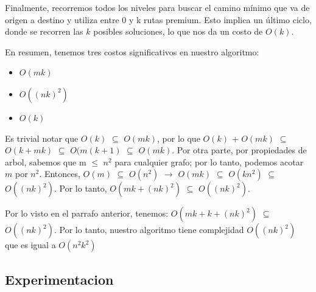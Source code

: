 Finalmente, recorremos todos los niveles para buscar el camino mínimo que va de origen a destino y utiliza entre 0 y k rutas premium. Esto implica un último ciclo, donde se recorren las $k$ posibles soluciones, lo que nos da un costo de $O(k)$.
\\
\par
En resumen, tenemos tres costos significativos en nuestro algoritmo:
\begin{itemize}
\item $O(mk)$
\item $O((nk)^2)$
\item $O(k)$
\end{itemize}
Es trivial notar que $O(k)$ $\subseteq$ $O(mk)$, por lo que $O(k)$ + $O(mk)$ $\subseteq$ $O(k + mk)$ $\subseteq$ $O(m(k+1)$ $\subseteq$ $O(mk)$. Por otra parte, por propiedades de arbol, sabemos que m $\leq$ $n^2$ para cualquier grafo; por lo tanto, podemos acotar $m$ por $n^2$. Entonces, $O(m)$ $\subseteq$ $O(n^2)$ $\rightarrow$ $O(mk)$ $\subseteq$ $O(kn^2)$ $\subseteq$ $O((nk)^2)$. Por lo tanto, $O(mk + (nk)^2)$ $\subseteq$ $O((nk)^2)$.
\\
\par
Por lo visto en el parrafo anterior, tenemos: $O(mk + k + (nk)^2)$ $\subseteq$ $O((nk)^2)$. Por lo tanto, nuestro algoritmo tiene complejidad $O((nk)^2)$ que es igual a $O(n^2k^2)$
\subsection{Experimentacion}

\pagebreak
